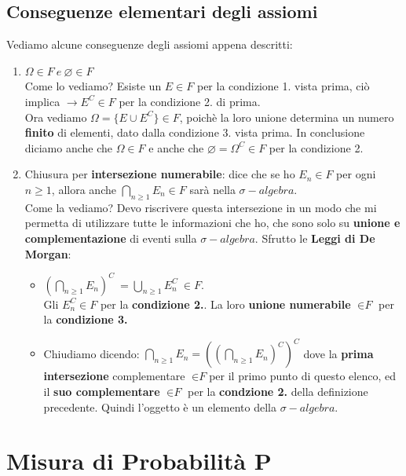 \documentclass{report}
\begin{document}
\subsection{Conseguenze elementari degli assiomi}
Vediamo alcune conseguenze degli assiomi appena descritti: \begin{enumerate}
    \item \(\Omega \in \textit{F}\ e\ \varnothing \in \textit{F}\)\\ Come lo vediamo? Esiste un \(E \in \textit{F}\) per la condizione 1. vista prima, ciò implica \(\longrightarrow E^C \in \textit{F}\) per la condizione 2. di prima.\\ 
    Ora vediamo \(\Omega = \{E \cup E^C\} \in \textit{F}\), poichè la loro unione determina un numero \textbf{finito} di elementi, dato dalla condizione 3. vista prima. In conclusione diciamo anche che \(\Omega \in \textit{F}\) e anche che \(\varnothing = \Omega^C \in \textit{F}\) per la condizione 2.
    \item Chiusura per \textbf{intersezione numerabile}: dice che se ho \(E_n \in \textit{F}\) per ogni \(n \geq 1\), allora anche \(\bigcap_{n \geq 1}E_n \in \textit{F}\) sarà nella \(\sigma-algebra\).\\
    Come la vediamo? Devo riscrivere questa intersezione in un modo che mi permetta di utilizzare tutte le informazioni che ho, che sono solo su \textbf{unione e complementazione} di eventi sulla \(\sigma-algebra\). Sfrutto le \textbf{Leggi di De Morgan}: \begin{itemize}
        \item \((\bigcap_{n \geq 1}E_n)^C\ = \bigcup_{n \geq 1}E_n^C\ \in \textit{F}\).\\ Gli \(E_n^C \in \textit{F}\) per la \textbf{condizione 2.}. La loro \textbf{unione numerabile} \(\in \textit{F}\) per la \textbf{condizione 3.}
        \item Chiudiamo dicendo: \(\bigcap_{n \geq 1}E_n = ((\bigcap_{n \geq 1}E_n)^C)^C\) dove la \textbf{prima intersezione} complementare \(\in \textit{F}\)per il primo punto di questo elenco, ed il \textbf{suo complementare} \(\in \textit{F}\) per la \textbf{condzione 2.} della definizione precedente. Quindi l'oggetto è un elemento della \(\sigma-algebra\).
    \end{itemize}
\end{enumerate}
\section{Misura di Probabilità P}
\end{document}
